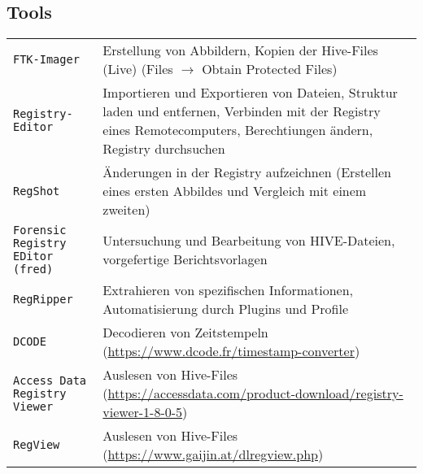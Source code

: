 \begin{multicols}{3}
\section{Tools}
\begin{tabular}{@{}p{\the\MyLen}%
		@{}p{\linewidth-\the\MyLen}@{}}
	\texttt{FTK-Imager} & Erstellung von Abbildern, Kopien der Hive-Files (Live) (Files $\rightarrow$ Obtain Protected Files)\\
	\texttt{Registry-Editor} & Importieren und Exportieren von Dateien, Struktur laden und entfernen, Verbinden mit der Registry eines Remotecomputers, Berechtiungen ändern, Registry durchsuchen\\
	\texttt{RegShot} & Änderungen in der Registry aufzeichnen (Erstellen eines ersten Abbildes und Vergleich mit einem zweiten)\\
	\texttt{Forensic Registry EDitor (fred)} & Untersuchung und Bearbeitung von HIVE-Dateien, vorgefertige Berichtsvorlagen\\
	\texttt{RegRipper} & Extrahieren von spezifischen Informationen, Automatisierung durch Plugins und Profile\\
	\texttt{DCODE} & Decodieren von Zeitstempeln (\url{https://www.dcode.fr/timestamp-converter})\\
	\texttt{Access Data Registry Viewer} & Auslesen von Hive-Files (\url{https://accessdata.com/product-download/registry-viewer-1-8-0-5})\\
	\texttt{RegView} & Auslesen von Hive-Files (\url{https://www.gaijin.at/dlregview.php})\\
\end{tabular}

\end{multicols}